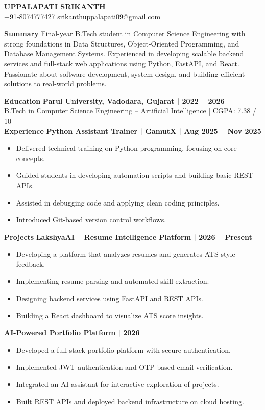 \documentclass[10pt]{article}
\begin{document}
\begin{center}
    {\LARGE \textbf{UPPALAPATI SRIKANTH}} \\
    +91-8074777427 \textbar{} srikanthuppalapati09@gmail.com
\end{center}

\textbf{Summary}
Final-year B.Tech student in Computer Science Engineering with strong foundations in Data Structures, Object-Oriented Programming, and Database Management Systems. Experienced in developing scalable backend services and full-stack web applications using Python, FastAPI, and React. Passionate about software development, system design, and building efficient solutions to real-world problems.

\textbf{Education}
\textbf{Parul University, Vadodara, Gujarat | 2022 – 2026}\\
B.Tech in Computer Science Engineering – Artificial Intelligence | CGPA: 7.38 / 10\\

\textbf{Experience}
\textbf{Python Assistant Trainer | GamutX | Aug 2025 – Nov 2025}
\begin{itemize}
\item Delivered technical training on Python programming, focusing on core concepts.
\item Guided students in developing automation scripts and building basic REST APIs.
\item Assisted in debugging code and applying clean coding principles.
\item Introduced Git-based version control workflows.
\end{itemize}

\textbf{Projects}
\textbf{LakshyaAI – Resume Intelligence Platform | 2026 – Present}
\begin{itemize}
\item Developing a platform that analyzes resumes and generates ATS-style feedback.
\item Implementing resume parsing and automated skill extraction.
\item Designing backend services using FastAPI and REST APIs.
\item Building a React dashboard to visualize ATS score insights.
\end{itemize}

\textbf{AI-Powered Portfolio Platform | 2026}
\begin{itemize}
\item Developed a full-stack portfolio platform with secure authentication.
\item Implemented JWT authentication and OTP-based email verification.
\item Integrated an AI assistant for interactive exploration of projects.
\item Built REST APIs and deployed backend infrastructure on cloud hosting.
\end{itemize}
\end{document}
